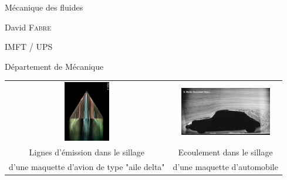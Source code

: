 \begin{frame}

  \color{bleu}

  \begin{flushleft}
    
    \Large
   	\bf
    
    Mécanique des fluides 

  \end{flushleft}
  

  \begin{flushright}

    \rm

    \textrm{David} \textsc{Fabre}
    
    \vspace{3mm}
    
    IMFT / UPS
    
    Département de Mécanique
    

  \end{flushright}


\begin{tabular}{cc}
\includegraphics[width=20mm]{./Figures/Werle_aileDelta.jpeg}
&
\includegraphics[width=40mm]{./Figures/Werle_Voiture.jpeg}
\\
\small Lignes d'émission dans le sillage  
&
\small Ecoulement dans le sillage 
\\
\small d'une maquette d'avion de type "aile delta"
&
\small d'une maquette d'automobile
\end{tabular}


\end{frame}
